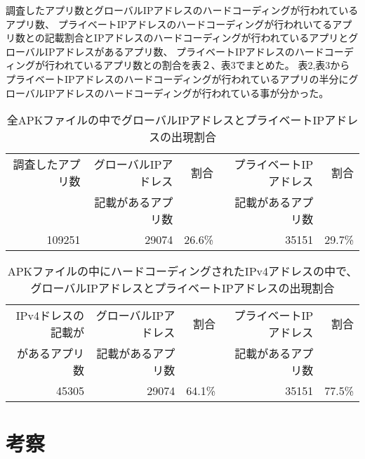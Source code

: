 \documentclass[a4j]{jarticle}
\begin{document}
調査したアプリ数とグローバルIPアドレスのハードコーディングが行われているアプリ数、
プライベートIPアドレスのハードコーディングが行われいてるアプリ数との記載割合とIPアドレスのハードコーディングが行われているアプリとグローバルIPアドレスがあるアプリ数、
プライベートIPアドレスのハードコーディングが行われているアプリ数との割合を表２、表3でまとめた。
表2,表3からプライベートIPアドレスのハードコーディングが行われているアプリの半分にグローバルIPアドレスのハードコーディングが行われている事が分かった。

\begin{table}[htb]
\begin{center}
	\caption{全APKファイルの中でグローバルIPアドレスとプライベートIPアドレスの出現割合}
	\begin{tabular}{|r|r|r|r|r|}

	\hline
	調査したアプリ数 & グローバルIPアドレス & 割合 & プライベートIPアドレス&割合 \\
	&記載があるアプリ数 & &記載があるアプリ数 &\\
	\hline
		109251 & 29074 & 26.6\% & 35151&29.7\% \\
	\hline
	\end{tabular}
	\end{center}
\end{table}

\begin{table}[htb]
	\begin{center}
		\caption{APKファイルの中にハードコーディングされたIPv4アドレスの中で、グローバルIPアドレスとプライベートIPアドレスの出現割合}
		\begin{tabular}{|r|r|r|r|r|}
	
		\hline
		IPv4ドレスの記載が& グローバルIPアドレス & 割合 & プライベートIPアドレス&割合 \\
		があるアプリ数&記載があるアプリ数 & &記載があるアプリ数 &\\
		\hline
			45305 & 29074 & 64.1\% & 35151&77.5\% \\
		\hline
		\end{tabular}
		\end{center}
	\end{table}


\newpage
\section{考察}
\end{document}
